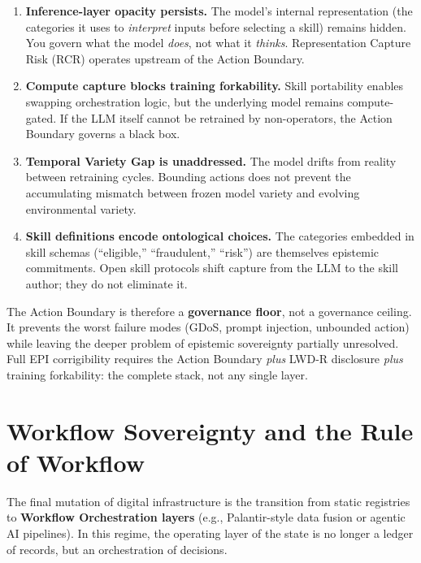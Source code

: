 \documentclass[11pt,a4paper]{article}
\theoremstyle{definition}
\begin{document}
\begin{enumerate}[noitemsep]
    \item \textbf{Inference-layer opacity persists.} The model's internal representation (the categories it uses to \textit{interpret} inputs before selecting a skill) remains hidden. You govern what the model \textit{does}, not what it \textit{thinks}. Representation Capture Risk (RCR) operates upstream of the Action Boundary.

    \item \textbf{Compute capture blocks training forkability.} Skill portability enables swapping orchestration logic, but the underlying model remains compute-gated. If the LLM itself cannot be retrained by non-operators, the Action Boundary governs a black box.

    \item \textbf{Temporal Variety Gap is unaddressed.} The model drifts from reality between retraining cycles. Bounding actions does not prevent the accumulating mismatch between frozen model variety and evolving environmental variety.

    \item \textbf{Skill definitions encode ontological choices.} The categories embedded in skill schemas (``eligible,'' ``fraudulent,'' ``risk'') are themselves epistemic commitments. Open skill protocols shift capture from the LLM to the skill author; they do not eliminate it.
\end{enumerate}

The Action Boundary is therefore a \textbf{governance floor}, not a governance ceiling. It prevents the worst failure modes (GDoS, prompt injection, unbounded action) while leaving the deeper problem of epistemic sovereignty partially unresolved. Full EPI corrigibility requires the Action Boundary \textit{plus} LWD-R disclosure \textit{plus} training forkability: the complete stack, not any single layer.


\section{Workflow Sovereignty and the Rule of Workflow}
\label{sec:workflow}

The final mutation of digital infrastructure is the transition from static registries to \textbf{Workflow Orchestration layers} (e.g., Palantir-style data fusion or agentic AI pipelines). In this regime, the operating layer of the state is no longer a ledger of records, but an orchestration of decisions.
\end{document}
